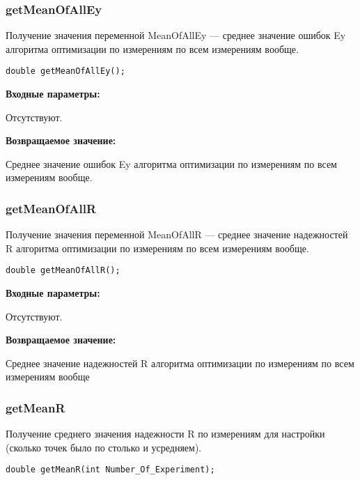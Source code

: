 \documentclass[a4paper,12pt]{article}
\begin{document}
\subsubsection{getMeanOfAllEy}\label{getMeanOfAllEy}

Получение значения переменной MeanOfAllEy --- среднее значение ошибок Ey алгоритма оптимизации по измерениям по всем измерениям вообще.


\begin{lstlisting}[label=code_syntax_getMeanOfAllEy,caption=Синтаксис]
double getMeanOfAllEy();
\end{lstlisting}

\textbf{Входные параметры:}

Отсутствуют.

\textbf{Возвращаемое значение:}

Среднее значение ошибок Ey алгоритма оптимизации по измерениям по всем измерениям вообще.


\subsubsection{getMeanOfAllR}\label{getMeanOfAllR}

Получение значения переменной MeanOfAllR --- среднее значение надежностей R алгоритма оптимизации по измерениям по всем измерениям вообще.


\begin{lstlisting}[label=code_syntax_getMeanOfAllR,caption=Синтаксис]
double getMeanOfAllR();
\end{lstlisting}

\textbf{Входные параметры:}

Отсутствуют.

\textbf{Возвращаемое значение:}

Среднее значение надежностей R алгоритма оптимизации по измерениям по всем измерениям вообще


\subsubsection{getMeanR}\label{getMeanR}

Получение среднего значения надежности R по измерениям для настройки (сколько точек было по столько и усредняем).


\begin{lstlisting}[label=code_syntax_getMeanR,caption=Синтаксис]
double getMeanR(int Number_Of_Experiment);
\end{lstlisting}
\end{document}

